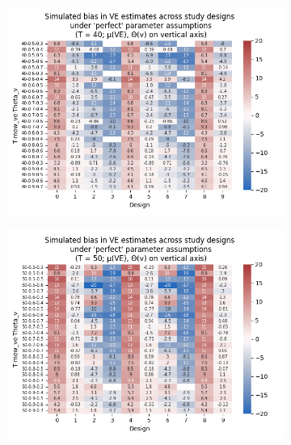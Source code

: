 \documentclass[12pt]{article}
\begin{document}
\begin{figure}[H]
	\begin{subfigure}[c]{0.48\linewidth}
		\centering
		\caption{}
		\includegraphics[scale=0.55]{VEMethod_Sim1b_PureDesignBias_Heatmap40.png}
	\end{subfigure}
	\begin{subfigure}[c]{0.48\linewidth}
		\centering
		\caption{}
		\includegraphics[scale=0.55]{VEMethod_Sim1b_PureDesignBias_Heatmap50.png}
	\end{subfigure}


\end{figure}
\end{document}
